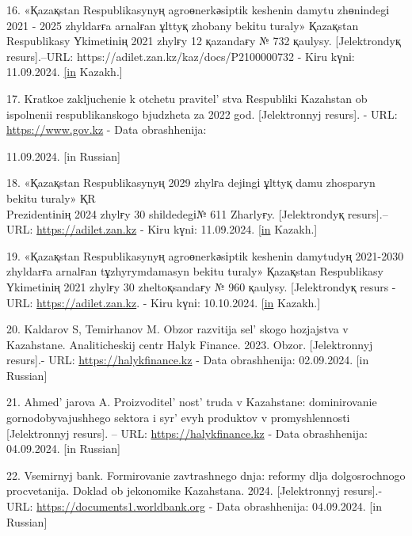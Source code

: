 \begin{references}
16. «Қazaқstan Respublikasynyң agroөnerkәsіptіk keshenіn damytu
zhөnіndegі 2021 - 2025 zhyldarғa arnalғan ұlttyқ zhobany bekіtu turaly»
Қazaқstan Respublikasy Үkіmetіnің 2021 zhylғy 12 қazandaғy № 732
қaulysy. {[}Jelektrondyқ resurs{]}.--URL:
https://adilet.zan.kz/kaz/docs/P2100000732 - Kіru kүnі: \\11.09.2024.
\href{https://kaz.zakon.kz/kogam-tynysy/6048484.\%20\%20\%20\%5bin}{{[}in}
Kazakh.{]}

17. Kratkoe zakljuchenie k otchetu pravitel' stva
Respubliki Kazahstan ob ispolnenii respublikanskogo bjudzheta za 2022
god. {[}Jelektronnyj resurs{]}. - URL:
\href{https://www.gov.kz/uploads/2023/5/18/f1f30399b1cf29f090a2a7a39}{https://www.gov.kz} - Data
obrashhenija:

11.09.2024. {[}in Russian{]}

18. «Қazaқstan Respublikasynyң 2029 zhylғa dejіngі ұlttyқ damu zhosparyn
bekіtu turaly» ҚR \\Prezidentіnің 2024 zhylғy 30 shіldedegі№ 611 Zharlyғy.
{[}Jelektrondyқ resurs{]}.--URL: \href{https://adilet.zan.kz/kaz/docs}{https://adilet.zan.kz} - Kіru
kүnі: 11.09.2024.
\href{https://kaz.zakon.kz/kogam-tynysy/6048484.\%20\%20\%20\%5bin}{{[}in}
Kazakh.{]}

19. «Қazaқstan Respublikasynyң agroөnerkәsіptіk keshenіn damytudyң
2021-2030 zhyldarғa arnalғan tұzhyrymdamasyn bekіtu turaly» Қazaқstan
Respublikasy Үkіmetіnің 2021 zhylғy 30 zheltoқsandaғy № 960 қaulysy.
{[}Jelektrondyқ resurs - URL:
\href{https://adilet.zan.kz/kaz/docs/P2100000960}{https://adilet.zan.kz}. - Kіru kүnі: 10.10.2024.
\href{https://kaz.zakon.kz/kogam-tynysy/6048484.\%20\%20\%20\%5bin}{{[}in}
Kazakh.{]}

20. Kaldarov S, Temirhanov M. Obzor razvitija sel' skogo
hozjajstva v Kazahstane. Analiticheskij centr Halyk Finance. 2023.
Obzor. {[}Jelektronnyj resurs{]}.- URL:
\href{https://halykfinance.kz/download/files/analytics/AC_agriculture_development.pdf}{https://halykfinance.kz}
- Data obrashhenija: 02.09.2024. {[}in Russian{]}

21. Ahmed' jarova A.
Proizvoditel' nost'{} truda v Kazahstane:
dominirovanie gornodobyvajushhego sektora i syr' evyh
produktov v promyshlennosti {[}Jelektronnyj resurs{]}. -- URL:
\href{https://halykfinance.kz/download/files/analytics/ac_labor2.pdf}{https://halykfinance.kz} - Data
obrashhenija: 04.09.2024. {[}in Russian{]}

22. Vsemirnyj bank. Formirovanie zavtrashnego dnja: reformy dlja
dolgosrochnogo procvetanija. Doklad ob jekonomike Kazahstana. 2024.
{[}Jelektronnyj resurs{]}.- URL:
\href{https://documents1.worldbank.org/curated/en.pdf}{https://documents1.worldbank.org} - Data obrashhenija:
04.09.2024. {[}in Russian{]}
\end{references}


